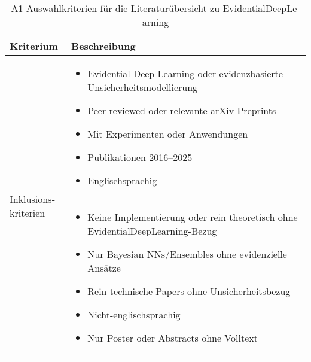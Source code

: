 \begin{otherlanguage}{ngerman}
\begin{table}[htbp]
\centering
\footnotesize
\begin{tabularx}{\textwidth}{|l|X|}
\hline
\textbf{Kriterium} & \hspace{0.6em}\textbf{Beschreibung} \\ \hline
\multirow{7}{*}{\centering Inklusionskriterien} &
\begin{itemize}[topsep=0em, itemsep=0em, leftmargin=*, label={}]
  \item Evidential Deep Learning oder evidenzbasierte Unsicherheitsmodellierung
  \item Peer-reviewed oder relevante arXiv-Preprints
  \item Mit Experimenten oder Anwendungen
  \item Publikationen 2016–2025
  \item Englischsprachig
\end{itemize} \\ \hline
\multirow{7}{*}{\centering Exklusionskriterien} &
\begin{itemize}[topsep=0em, itemsep=0em, leftmargin=*, label={}]
  \item Keine Implementierung oder rein theoretisch ohne \gls{EvidentialDeepLearning}-Bezug
  \item Nur Bayesian NNs/Ensembles ohne evidenzielle Ansätze
  \item Rein technische Papers ohne Unsicherheitsbezug
  \item Nicht-englischsprachig
  \item Nur Poster oder Abstracts ohne Volltext
\end{itemize} \\ \hline
\end{tabularx}

\caption{A1 Auswahlkriterien für die Literaturübersicht zu \gls{EvidentialDeepLearning}}
\label{tab:auswahlkriterien}
\end{table}








\end{otherlanguage}
